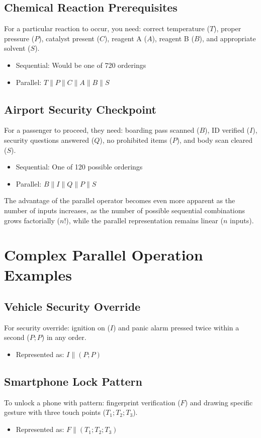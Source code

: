 \subsection*{Chemical Reaction Prerequisites}
For a particular reaction to occur, you need: correct temperature ($T$), proper pressure ($P$), catalyst present ($C$), reagent A ($A$), reagent B ($B$), and appropriate solvent ($S$).
\begin{itemize}
    \item Sequential: Would be one of 720 orderings
    \item Parallel: $T\|P\|C\|A\|B\|S$
\end{itemize}

\subsection*{Airport Security Checkpoint}
For a passenger to proceed, they need: boarding pass scanned ($B$), ID verified ($I$), security questions answered ($Q$), no prohibited items ($P$), and body scan cleared ($S$).
\begin{itemize}
    \item Sequential: One of 120 possible orderings
    \item Parallel: $B\|I\|Q\|P\|S$
\end{itemize}

The advantage of the parallel operator becomes even more apparent as the number of inputs increases, as the number of possible sequential combinations grows factorially ($n!$), while the parallel representation remains linear ($n$ inputs).


\section*{Complex Parallel Operation Examples}

\subsection*{Vehicle Security Override}
For security override: ignition on ($I$) and panic alarm pressed twice within a second ($P;P$) in any order.
\begin{itemize}
    \item Represented as: $I \parallel (P;P)$
\end{itemize}

\subsection*{Smartphone Lock Pattern}
To unlock a phone with pattern: fingerprint verification ($F$) and drawing specific gesture with three touch points ($T_1;T_2;T_3$).
\begin{itemize}
    \item Represented as: $F \parallel (T_1;T_2;T_3)$
\end{itemize}

